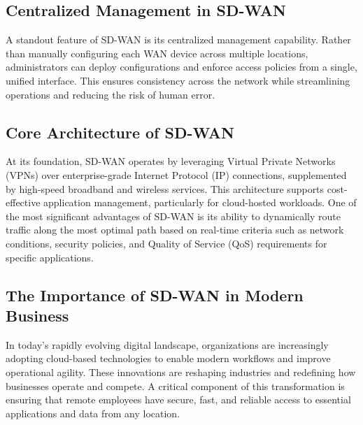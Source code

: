 \documentclass[12pt,english]{report}
\begin{document}
\subsection{Centralized Management in SD-WAN}
A standout feature of SD-WAN is its centralized management capability. Rather than manually configuring each WAN device across multiple locations, administrators can deploy configurations and enforce access policies from a single, unified interface. This ensures consistency across the network while streamlining operations and reducing the risk of human error\cite{ref2}.
\subsection{Core Architecture of SD-WAN}
At its foundation, SD-WAN operates by leveraging Virtual Private Networks (VPNs) over enterprise-grade Internet Protocol (IP) connections, supplemented by high-speed broadband and wireless services. This architecture supports cost-effective application management, particularly for cloud-hosted workloads. One of the most significant advantages of SD-WAN is its ability to dynamically route traffic along the most optimal path based on real-time criteria such as network conditions, security policies, and Quality of Service (QoS) requirements for specific applications\cite{ref3}.
\subsection{The Importance of SD-WAN in Modern Business}
In today’s rapidly evolving digital landscape, organizations are increasingly adopting cloud-based technologies to enable modern workflows and improve operational agility. These innovations are reshaping industries and redefining how businesses operate and compete. A critical component of this transformation is ensuring that remote employees have secure, fast, and reliable access to essential applications and data from any location\cite{ref3}.
\end{document}
